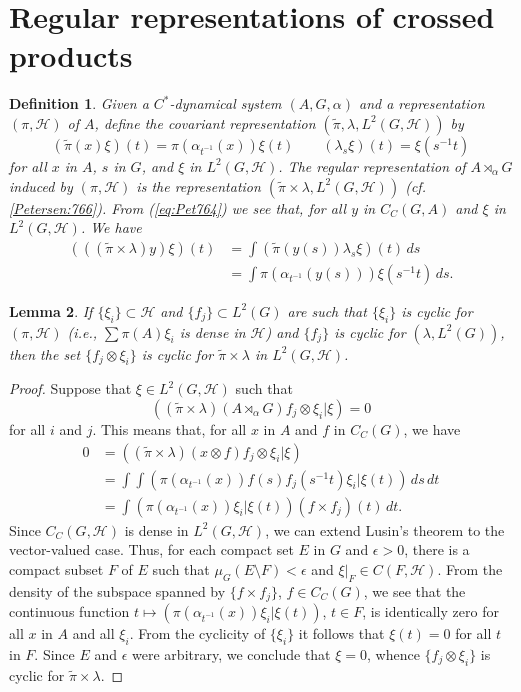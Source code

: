 \documentclass{book}
\newtheorem{definition}{Definition}[section]
\newtheorem{lemma}[definition]{Lemma}
\begin{document}
\section{Regular representations of crossed products}
\begin{definition}\label{Petersen:771}
  Given a \(C^*\)-dynamical system \((A,G,\alpha)\) and a representation
  \((\pi,\mathcal{H})\) of \(A\), define the covariant representation \((\tilde{\pi},\lambda,L^2(G,\mathcal{H}))\) by
  \[
    (\tilde{\pi}(x)\xi)(t)=\pi(\alpha_{t^{-1}}(x))\xi(t)\qquad (\lambda_s \xi)(t)=\xi(s^{-1}t)
  \]
  for all \(x\) in \(A\), \(s\) in \(G\), and \(\xi\) in \(L^2(G,\mathcal{H})\).
  The \textnormal{regular representation} of \(A\rtimes_\alpha G\) induced by \((\pi,\mathcal{H})\) is the representation 
  \((\tilde{\pi}\times\lambda,L^2(G,\mathcal{H}))\) (cf. \ref{Petersen:766}).
  From (\ref{eq:Pet764}) we see that, for all \(y\) in \(C_C(G,A)\) and \(\xi\) in \(L^2(G,\mathcal{H})\). We have
  \begin{align*}
    (((\tilde{\pi}\times\lambda)y)\xi)(t)&=\int(\tilde{\pi}(y(s))\lambda_s\xi)(t)\,ds\\
    &=\int\pi(\alpha_{t^{-1}}(y(s)))\xi(s^{-1}t)\,ds.
  \end{align*}
\end{definition}
\begin{lemma}\label{Petersen:772}
  If \(\{\xi_i\}\subset\mathcal{H}\) and \(\{f_j\}\subset L^2(G)\) are such that \(\{\xi_i\}\)
  is cyclic for \((\pi,\mathcal{H})\) (i.e., \(\sum\pi(A)\xi_i\) is dense in \(\mathcal{H}\)) and \(\{f_j\}\) is cyclic for \((\lambda,L^2(G))\),
  then the set \(\{f_j\otimes\xi_i\}\) is cyclic for \(\tilde{\pi}\times\lambda\) in \(L^2(G,\mathcal{H})\).
\end{lemma}
\begin{proof}
  Suppose that \(\xi\in L^2(G,\mathcal{H})\) such that
  \[
    ((\tilde{\pi}\times\lambda)(A\rtimes_\alpha G)f_j\otimes\xi_i|\xi)=0
  \]
  for all \(i\) and \(j\). This means that, for all \(x\) in \(A\) and \(f\) in \(C_C(G)\), we have
  \begin{align*}
    0&=((\tilde{\pi}\times\lambda)(x\otimes f)f_j\otimes\xi_i|\xi)\\
    &=\int\int(\pi(\alpha_{t^{-1}}(x))f(s)f_j(s^{-1}t)\xi_i|\xi(t))\,ds\,dt\\
    &=\int(\pi(\alpha_{t^{-1}}(x))\xi_i|\xi(t))(f\times f_j)(t)\,dt.
  \end{align*}
  Since \(C_C(G,\mathcal{H})\) is dense in \(L^2(G,\mathcal{H})\), we can extend Lusin's theorem to the vector-valued case.
  Thus, for each compact set \(E\) in \(G\) and \(\epsilon>0\), there is a 
  compact subset \(F\) of \(E\) such that \(\mu_G(E\setminus F)<\epsilon\) and 
  \(\xi|_F\in C(F,\mathcal{H})\). From the density of the subspace spanned by 
  \(\{f\times f_j\}\), \(f\in C_C(G)\), we see that the continuous function
  \(t\mapsto(\pi(\alpha_{t^{-1}}(x))\xi_i|\xi(t))\), \(t\in F\), is identically zero for all \(x\) in \(A\) and all \(\xi_i\).
  From the cyclicity of \(\{\xi_i\}\) it follows that \(\xi(t)=0\) for all \(t\) in \(F\).
  Since \(E\) and \(\epsilon\) were arbitrary, we conclude that \(\xi=0\), whence \(\{f_j\otimes \xi_i\}\)
  is cyclic for \(\tilde{\pi}\times\lambda\).
\end{proof}
\end{document}
